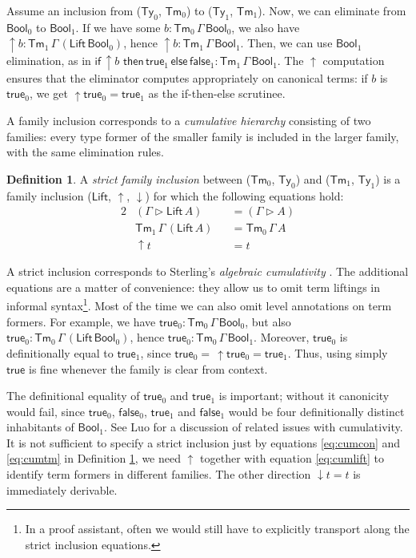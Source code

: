 \documentclass[a4paper,UKenglish,cleveref, autoref, thm-restate]{lipics-v2021}
\theoremstyle{remark}
\theoremstyle{definition}
\newtheorem{mydefinition}{Definition}
\newcommand{\Ty}{\mathsf{Ty}}
\newcommand{\Tm}{\mathsf{Tm}}
\newcommand{\ext}{\triangleright}
\newcommand{\Bool}{\mathsf{Bool}}
\newcommand{\true}{\mathsf{true}}
\newcommand{\false}{\mathsf{false}}
\newcommand{\up}{\uparrow}
\newcommand{\down}{\downarrow}
\newcommand{\Lift}{\mathsf{Lift}}
\begin{document}
Assume an inclusion from ($\Ty_0$, $\Tm_0$) to ($\Ty_1$, $\Tm_1$). Now, we can
eliminate from $\Bool_0$ to $\Bool_1$. If we have some $b :
\Tm_0\,\Gamma\,\Bool_0$, we also have $\up\!b :
\Tm_1\,\Gamma\,(\Lift\,\Bool_0)$, hence $\up\!b :
\Tm_1\,\Gamma\,\Bool_1$. Then, we can use $\Bool_1$ elimination, as in
$\mathsf{if}\,\up\!b\,\,\mathsf{then}\,\true_1\,\mathsf{else}\,\false_1 :
\Tm_1\,\Gamma\,\Bool_1$. The $\up$ computation ensures that the eliminator
computes appropriately on canonical terms: if $b$ is $\true_0$, we get
$\up\!\true_0 = \true_1$ as the if-then-else scrutinee.

A family inclusion corresponds to a \emph{cumulative hierarchy} consisting of
two families: every type former of the smaller family is included in the larger
family, with the same elimination rules.

\begin{mydefinition}\label{def:strict_inclusion}
A \emph{strict family inclusion} between ($\Tm_0$, $\Ty_0$) and ($\Tm_1$,
$\Ty_1$) is a family inclusion ($\Lift$, $\up$, $\down$) for which the following equations hold:
\begin{alignat}{2}
  & (\Gamma \ext \Lift\,A) &&= (\Gamma \ext A)     \label{eq:cumcon}    \\
  & \Tm_1\,\Gamma\,(\Lift\,A) &&= \Tm_0\,\Gamma\,A  \label{eq:cumtm}     \\
  & \up\!t &&= t                                    \label{eq:cumlift}
\end{alignat}
\end{mydefinition}

A strict inclusion corresponds to Sterling's \emph{algebraic cumulativity}
\cite{sterling2019algebraic}. The additional equations are a matter of
convenience: they allow us to omit term liftings in informal syntax\footnote{In
  a proof assistant, often we would still have to explicitly transport along the
  strict inclusion equations.}. Most of the time we can also omit level
annotations on term formers. For example, we have $\true_0 :
\Tm_0\,\Gamma\,\Bool_0$, but also $\true_0 : \Tm_0\,\Gamma\,(\Lift\,\Bool_0)$,
hence $\true_0 : \Tm_0\,\Gamma\,\Bool_1$. Moreover, $\true_0$ is definitionally
equal to $\true_1$, since $\true_0 =\,\up\!\true_0 = \true_1$. Thus, using
simply $\true$ is fine whenever the family is clear from context.

The definitional equality of $\true_0$ and $\true_1$ is important; without it
canonicity would fail, since $\true_0$, $\false_0$, $\true_1$ and $\false_1$
would be four definitionally distinct inhabitants of $\Bool_1$. See Luo
\cite{luo2012notes} for a discussion of related issues with cumulativity. It is
not sufficient to specify a strict inclusion just by equations \ref{eq:cumcon}
and \ref{eq:cumtm} in Definition \ref{def:strict_inclusion}, we need $\up$
together with equation \ref{eq:cumlift} to identify term formers in different
families. The other direction $\down\!t = t$ is immediately derivable.
\end{document}
